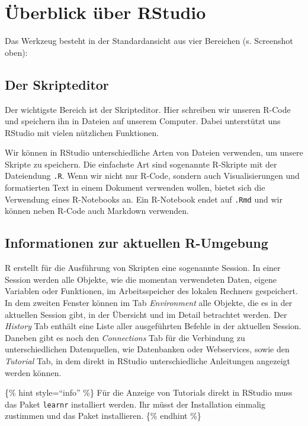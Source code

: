 \documentclass[
]{book}
\begin{document}
\hypertarget{uxfcberblick-uxfcber-rstudio}{%
\section{Überblick über RStudio}\label{uxfcberblick-uxfcber-rstudio}}

Das Werkzeug besteht in der Standardansicht aus vier Bereichen (s. Screenshot oben):

\hypertarget{der-skripteditor}{%
\subsection{Der Skripteditor}\label{der-skripteditor}}

Der wichtigste Bereich ist der Skripteditor. Hier schreiben wir unseren R-Code und speichern ihn in Dateien auf unserem Computer. Dabei unterstützt uns RStudio mit vielen nützlichen Funktionen.

Wir können in RStudio unterschiedliche Arten von Dateien verwenden, um unsere Skripte zu speichern. Die einfachste Art sind sogenannte R-Skripte mit der Dateiendung \texttt{.R}. Wenn wir nicht nur R-Code, sondern auch Visualisierungen und formatierten Text in einem Dokument verwenden wollen, bietet sich die Verwendung eines R-Notebooks an. Ein R-Notebook endet auf \texttt{.Rmd} und wir können neben R-Code auch Markdown verwenden.

\hypertarget{informationen-zur-aktuellen-r-umgebung}{%
\subsection{Informationen zur aktuellen R-Umgebung}\label{informationen-zur-aktuellen-r-umgebung}}

R erstellt für die Ausführung von Skripten eine sogenannte Session. In einer Session werden alle Objekte, wie die momentan verwendeten Daten, eigene Variablen oder Funktionen, im Arbeitsspeicher des lokalen Rechners gespeichert. In dem zweiten Fenster können im Tab \emph{Environment} alle Objekte, die es in der aktuellen Session gibt, in der Übersicht und im Detail betrachtet werden. Der \emph{History} Tab enthält eine Liste aller ausgeführten Befehle in der aktuellen Session. Daneben gibt es noch den \emph{Connections} Tab für die Verbindung zu unterschiedlichen Datenquellen, wie Datenbanken oder Webservices, sowie den \emph{Tutorial} Tab, in dem direkt in RStudio unterschiedliche Anleitungen angezeigt werden können.

\{\% hint style=``info'' \%\}
Für die Anzeige von Tutorials direkt in RStudio muss das Paket \texttt{learnr} installiert werden. Ihr müsst der Installation einmalig zustimmen und das Paket installieren.
\{\% endhint \%\}
\end{document}
